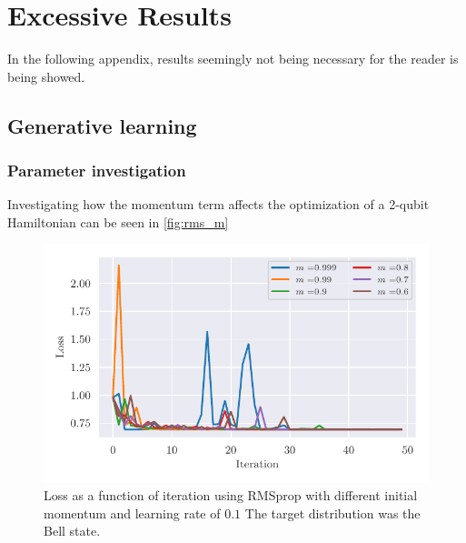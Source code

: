 \documentclass[../main.tex]{subfiles}
\begin{document}
\chapter{Excessive Results}
\label{sec:third-app}
In the following appendix, results seemingly not being necessary for the reader is being showed.

\section{Generative learning}
\subsection{Parameter investigation}
Investigating how the momentum term affects the optimization of a 2-qubit Hamiltonian can be seen in \autoref{fig:rms_m}

\begin{figure}[h]
    \begin{center}
        \includegraphics{figures/H2_rms_search_ab_loss_notlog.pdf}
        \caption{Loss as a function of iteration using RMSprop with different initial momentum and learning rate of $0.1$ The target distribution was the Bell state.}
        \label{fig:rms_m}
    \end{center}
\end{figure}
\end{document}
